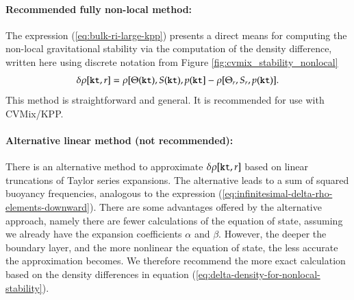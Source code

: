 \paragraph{Recommended fully non-local method:}
The expression (\ref{eq:bulk-ri-large-kpp}) presents a direct means
for computing the non-local gravitational stability via the
computation of the density difference, written here using discrete
notation from Figure  \ref{fig:cvmix_stability_nonlocal}
\begin{equation}
 \delta\rho[{\tt kt},r]  = \rho[\Theta({\tt kt}), S({\tt kt}), p({\tt kt} ]  -\rho[\Theta_{r}, S_{r}, p({\tt kt})].
\label{eq:delta-density-for-nonlocal-stability}
\end{equation}
This method is straightforward and general.  It is recommended for use
with CVMix/KPP.


\paragraph{Alternative linear method (not recommended):}

There is an alternative method to approximate $\delta\rho[{\tt kt},r]$
based on linear truncations of Taylor series expansions.  The
alternative leads to a sum of squared buoyancy frequencies, analogous
to the expression
(\ref{eq:infinitesimal-delta-rho-elements-downward}).  There are some
advantages offered by the alternative approach, namely there are fewer
calculations of the equation of state, assuming we already have the
expansion coefficients $\alpha$ and $\beta$.  However, the deeper the
boundary layer, and the more nonlinear the equation of state, the less
accurate the approximation becomes.  We therefore recommend the more
exact calculation based on the density differences in equation
(\ref{eq:delta-density-for-nonlocal-stability}).

